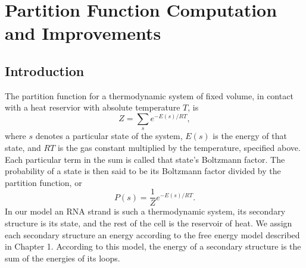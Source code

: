 \chapter{Partition Function Computation and Improvements} \label{pfChapter}
\section{Introduction}

The partition function for a thermodynamic system of fixed volume, in
contact with a heat reservior with absolute temperature $T$, is
\begin{equation} Z = \sum_s e^{-E(s)/ RT }, \end{equation}
where $s$ denotes a particular state of the system, $E(s)$ is the
energy of that state, and $RT$ is the gas constant multiplied by the
temperature, specified above. Each particular term in the sum is
called that state's Boltzmann factor. The probability of a state is
then said to be its Boltzmann factor divided by the partition
function, or
\begin{equation} P(s) = \frac{1}{Z}e^{-E(s)/RT}.  \end{equation}
In our model an RNA strand is such a thermodynamic system, its
secondary structure is its state, and the rest of the cell is the
reservoir of heat. We assign each secondary structure an energy
according to the free energy model described in Chapter 1. According
to this model, the energy of a secondary structure is the sum of the
energies of its loops. 

